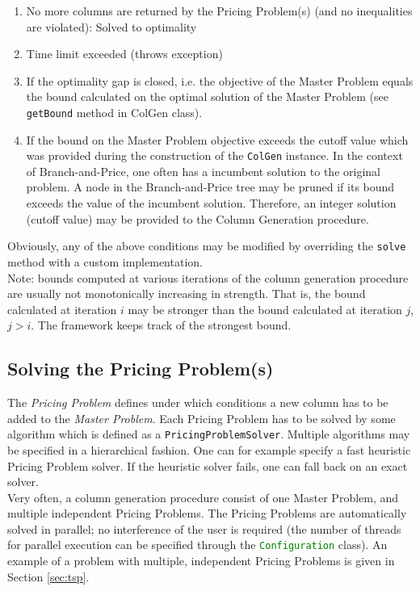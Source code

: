 \documentclass[a4paper]{article}
\newcommand{\code}[1]{\lstinline[language=java, style=seminar]!#1!}
\begin{document}
\begin{enumerate}
 \item No more columns are returned by the Pricing Problem(s) (and no inequalities are violated): Solved to optimality
 \item Time limit exceeded (throws exception)
 \item If the optimality gap is closed, i.e. the objective of the Master Problem equals the bound calculated on the optimal solution of the Master Problem (see \code{getBound} method in ColGen class).
 \item If the bound on the Master Problem objective exceeds the cutoff value which was provided during the construction of the \code{ColGen} instance. In the context of Branch-and-Price, one often has a incumbent solution to the original problem. A node in the Branch-and-Price tree may be pruned if its bound exceeds the value of the incumbent solution. Therefore, an integer solution (cutoff value) may be provided to the Column Generation procedure.
\end{enumerate}
Obviously, any of the above conditions may be modified by overriding the \code{solve} method with a custom implementation.\\
Note: bounds computed at various iterations of the column generation procedure are usually not monotonically increasing in strength. That is, the bound calculated at iteration $i$ may be stronger than the bound calculated at iteration $j$, $j>i$. The framework keeps track of the strongest bound.


\subsection{Solving the Pricing Problem(s)}\label{sec:colGen}
The \emph{Pricing Problem} defines under which conditions a new column has to be added to the \emph{Master Problem}. Each Pricing Problem has to be solved by some algorithm which is defined as a \code{PricingProblemSolver}. Multiple algorithms may be specified in a hierarchical fashion. One can for example specify a fast heuristic Pricing Problem solver. If the heuristic solver fails, one can fall back on an exact solver.\\
Very often, a column generation procedure consist of one Master Problem, and multiple independent Pricing Problems. The Pricing Problems are automatically solved in parallel; no interference of the user is required (the number of threads for parallel execution can be specified through the \code{Configuration} class). An example of a problem with multiple, independent Pricing Problems is given in Section \ref{sec:tsp}.
\end{document}
